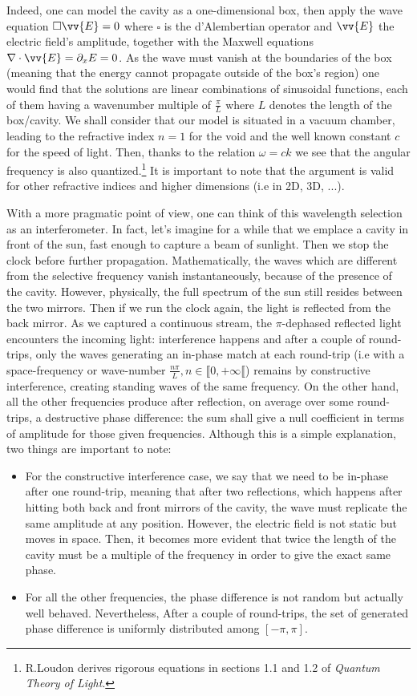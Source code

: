 \documentclass[11pt]{report}
\begin{document}
Indeed, one can model the cavity as a one-dimensional box, then apply the wave equation $ \square \vv{E} = 0$ where $\square$ is the d'Alembertian operator and $\vv{E}$ the electric field's amplitude, together with the Maxwell equations $\nabla \cdot \vv{E} = \partial _x E = 0$. As the wave must vanish at the boundaries of the box (meaning that the energy cannot propagate outside of the box's region) one would find that the solutions are linear combinations of sinusoidal functions, each of them having a wavenumber multiple of $\frac{\pi}{L}$ where $L$ denotes the length of the box/cavity. We shall consider that our model is situated in a vacuum chamber, leading to the refractive index $n=1$ for the void and the well known constant $ c$ for the speed of light. Then, thanks to the relation $\omega = ck$ we see that the angular frequency is also quantized.\footnote{R.Loudon derives rigorous equations in sections 1.1 and 1.2 of \textit{Quantum Theory of Light}.} It is important to note that the argument is valid for other refractive indices and higher dimensions (i.e in 2D, 3D, ...).

With a more pragmatic point of view, one can think of this wavelength selection as an interferometer. In fact, let's imagine for a while that we emplace a cavity in front of the sun, fast enough to capture a beam of sunlight. Then we stop the clock before further propagation. Mathematically, the waves which are different from the selective frequency vanish instantaneously, because of the presence of the cavity. However, physically, the full spectrum of the sun still resides between the two mirrors. Then if we run the clock again, the light is reflected from the back mirror. As we captured a continuous stream, the $\pi$-dephased reflected light encounters the incoming light: interference happens and after a couple of round-trips, only the waves generating an in-phase match at each round-trip (i.e with a space-frequency or wave-number $\frac{n\pi}{L}, n\in \llbracket 0, +\infty \llbracket $) remains by constructive interference, creating standing waves of the same frequency. On the other hand, all the other frequencies produce after reflection, on average over some round-trips, a destructive phase difference: the sum shall give a null coefficient in terms of amplitude for those given frequencies. Although this is a simple explanation, two things are important to note:
\begin{itemize}
  \item For the constructive interference case, we say that we need to be in-phase after one round-trip, meaning that after two reflections, which happens after hitting both back and front mirrors of the cavity, the wave must replicate the same amplitude at any position. However, the electric field is not static but moves in space. Then, it becomes more evident that twice the length of the cavity must be a multiple of the frequency in order to give the exact same phase.
  \item  For all the other frequencies, the phase difference is not random but actually well behaved. Nevertheless, After a couple of round-trips, the set of generated phase difference is uniformly distributed among $ \left[ -\pi, \pi \right] $.
\end{itemize}
\end{document}

